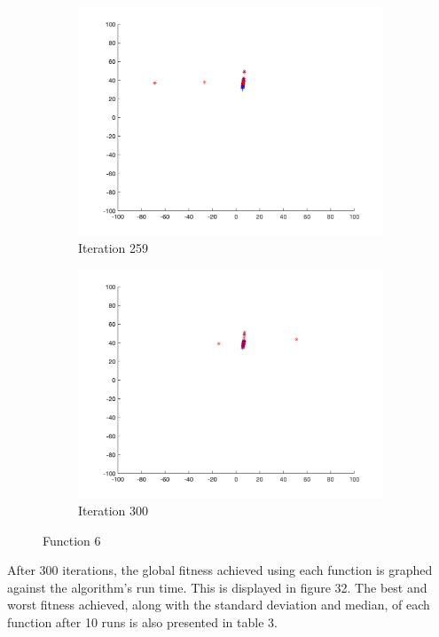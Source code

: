 \begin{figure}
\begin{subfigure}[b]{0.4\textwidth}
    \includegraphics[width=\textwidth]{img/smpl/rosn2d-9-100/loa-iter-259}
    \caption{Iteration 259}
    \label{fig:s6-iter-6}
  \end{subfigure}
  \begin{subfigure}[b]{0.4\textwidth}
    \includegraphics[width=\textwidth]{img/smpl/rosn2d-9-100/loa-iter-300}
    \caption{Iteration 300}
    \label{fig:s6-iter-7}
  \end{subfigure}
  \caption{Function 6}
\end{figure}

After 300 iterations, the global fitness achieved using each function is graphed against the algorithm's run time. This is displayed in figure 32. The best and worst fitness achieved, along with the standard deviation and median, of each function after 10 runs is also presented in table 3.

